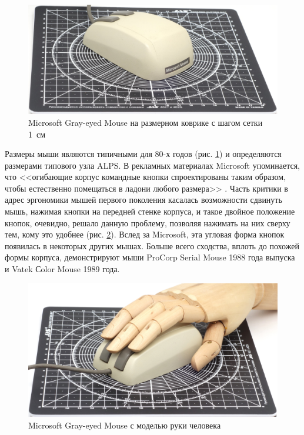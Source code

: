 \documentclass[11pt, a4paper]{article}
\begin{document}
\begin{figure}[h]
    \centering
    \includegraphics[scale=0.5]{1985_microsoft_gray_eyed_mouse/size_30.jpg}
    \caption{Microsoft Gray-eyed Mouse на размерном коврике с шагом сетки 1~см}
    \label{fig:MicrosoftGrayEyedSize}
\end{figure}

Размеры мыши являются типичными для 80-х годов (рис. \ref{fig:MicrosoftGrayEyedSize}) и определяются размерами типового узла ALPS. В рекламных материалах Microsoft упоминается, что <<огибающие корпус командные кнопки спроектированы таким образом, чтобы естественно помещаться в ладони любого размера>> \cite{mouses}. Часть критики в адрес эргономики мышей первого поколения касалась возможности сдвинуть мышь, нажимая кнопки на передней стенке корпуса, и такое двойное положение кнопок, очевидно, решало данную проблему, позволяя нажимать на них сверху тем, кому это удобнее (рис. \ref{fig:MicrosoftGrayEyedHand}). Вслед за Microsoft, эта угловая форма кнопок появилась в некоторых других мышах. Больше всего сходства, вплоть до похожей формы корпуса, демонстрируют мыши ProCorp Serial Mouse 1988 года выпуска и Vatek Сolor Mouse 1989 года.

\begin{figure}[h]
    \centering
    \includegraphics[scale=0.5]{1985_microsoft_gray_eyed_mouse/hand_30.jpg}
    \caption{Microsoft Gray-eyed Mouse с моделью руки человека}
    \label{fig:MicrosoftGrayEyedHand}
\end{figure}
\end{document}
